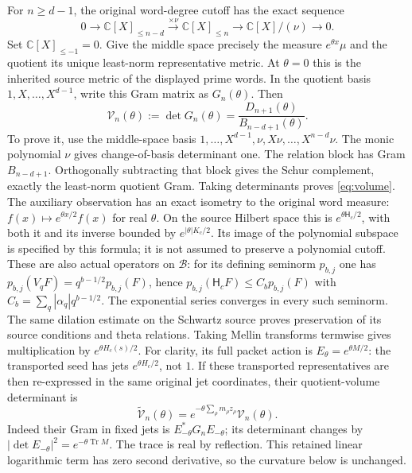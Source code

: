 \documentclass[11pt]{article}
\DeclareMathOperator{\Tr}{Tr}
\newcommand{\C}{\mathbb C}
\newcommand{\B}{\mathscr B}
\newcommand{\HS}{\mathsf H_c}
\begin{document}
For $n\ge d-1$, the original word-degree cutoff has the exact sequence
\begin{equation}
 0\longrightarrow\C[X]_{\le n-d}
 \xrightarrow{\times\nu}\C[X]_{\le n}
 \longrightarrow\C[X]/(\nu)\longrightarrow0.\label{eq:sequence}
\end{equation}
Set $\C[X]_{\le-1}=0$. Give the middle space precisely the measure
$e^{\theta x}\mu$ and the quotient its unique least-norm
representative metric. At $\theta=0$ this is the inherited source
metric of the displayed prime words. In the quotient basis
$1,X,\ldots,X^{d-1}$, write this Gram matrix as $G_n(\theta)$.
Then
\begin{equation}
 \mathcal V_n(\theta):=\det G_n(\theta)
       =\frac{D_{n+1}(\theta)}{B_{n-d+1}(\theta)}.
 \label{eq:volume}
\end{equation}
To prove it, use the middle-space basis
$1,\ldots,X^{d-1},\nu,X\nu,\ldots,X^{n-d}\nu$.
The monic polynomial $\nu$ gives change-of-basis determinant one.
The relation block has Gram $B_{n-d+1}$. Orthogonally subtracting
that block gives the Schur complement, exactly the least-norm
quotient Gram. Taking determinants proves \eqref{eq:volume}.
The auxiliary observation has an exact isometry to the original
word measure: $f(x)\mapsto e^{\theta x/2}f(x)$ for real $\theta$.
On the source Hilbert space this is $e^{\theta\HS/2}$, with both it
and its inverse bounded by $e^{|\theta|K_c/2}$. Its image of the
polynomial subspace is specified by this formula; it is not assumed
to preserve a polynomial cutoff.
These are also actual operators on $\B$: for its defining seminorm
$p_{b,j}$ one has $p_{b,j}(V_qF)=q^{b-1/2}p_{b,j}(F)$, hence
$p_{b,j}(\HS F)\le C_b p_{b,j}(F)$ with
$C_b=\sum_q|\alpha_q|q^{b-1/2}$.
The exponential series converges in every such seminorm. The
same dilation estimate on the Schwartz source proves preservation
of its source conditions and theta relations. Taking Mellin
transforms termwise gives multiplication by $e^{\theta H_c(s)/2}$.
For clarity, its full packet action is $E_\theta=e^{\theta M/2}$:
the transported seed has jets $e^{\theta H_c/2}$, not $1$.
If these transported representatives are then re-expressed in the
same original jet coordinates, their quotient-volume determinant is
\begin{equation}
 \widetilde{\mathcal V}_n(\theta)
 =e^{-\theta\sum_\rho m_\rho z_\rho}\mathcal V_n(\theta).
 \label{eq:tilt-coordinate}
\end{equation}
Indeed their Gram in fixed jets is
$E_{-\theta}^*G_nE_{-\theta}$; its determinant changes by
$|\det E_{-\theta}|^2=e^{-\theta\Tr M}$.
The trace is real by reflection. This retained linear logarithmic
term has zero second derivative, so the curvature below is unchanged.
\end{document}
